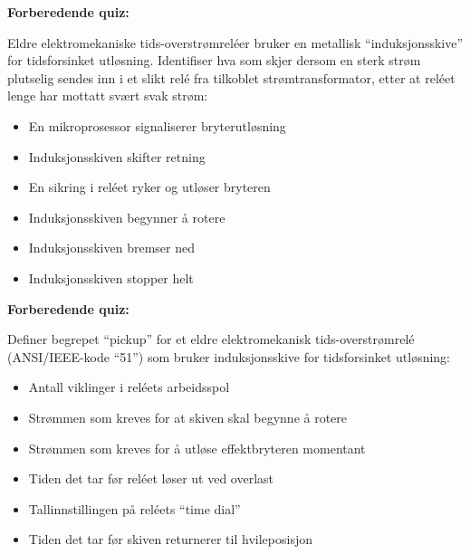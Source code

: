 \noindent
{\bf Forberedende quiz:}

Eldre elektromekaniske tids-overstrømreléer bruker en metallisk ``induksjonsskive'' for tidsforsinket utløsning. Identifiser hva som skjer dersom en sterk strøm plutselig sendes inn i et slikt relé fra tilkoblet strømtransformator, etter at reléet lenge har mottatt svært svak strøm:

\begin{itemize}
\item{} En mikroprosessor signaliserer bryterutløsning
\vskip 5pt 
\item{} Induksjonsskiven skifter retning
\vskip 5pt 
\item{} En sikring i reléet ryker og utløser bryteren
\vskip 5pt 
\item{} Induksjonsskiven begynner å rotere
\vskip 5pt 
\item{} Induksjonsskiven bremser ned
\vskip 5pt 
\item{} Induksjonsskiven stopper helt
\end{itemize}










\vfil \eject

\noindent
{\bf Forberedende quiz:}

Definer begrepet ``pickup'' for et eldre elektromekanisk tids-overstrømrelé (ANSI/IEEE-kode ``51'') som bruker induksjonsskive for tidsforsinket utløsning:

\begin{itemize}
\item{} Antall viklinger i reléets arbeidsspol
\vskip 5pt 
\item{} Strømmen som kreves for at skiven skal begynne å rotere
\vskip 5pt 
\item{} Strømmen som kreves for å utløse effektbryteren momentant
\vskip 5pt 
\item{} Tiden det tar før reléet løser ut ved overlast
\vskip 5pt 
\item{} Tallinnstillingen på reléets ``time dial''
\vskip 5pt 
\item{} Tiden det tar før skiven returnerer til hvileposisjon
\end{itemize}


